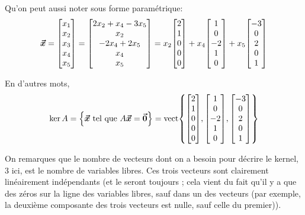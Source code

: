 \documentclass[a4paper]{article}
\begin{document}
{    Qu'on peut aussi noter sous forme paramétrique:
    \[\bvec{x} = \begin{bmatrix} x_1 \\ x_2 \\ x_3 \\ x_4 \\ x_5 \end{bmatrix} = \begin{bmatrix} 2x_2 + x_4 - 3x_5 \\ x_2 \\ -2x_4 + 2x_5 \\ x_4 \\ x_5 \end{bmatrix} = x_2 \begin{bmatrix} 2 \\ 1 \\ 0 \\ 0 \\ 0 \end{bmatrix} + x_4 \begin{bmatrix} 1 \\ 0 \\ -2 \\ 1 \\ 0 \end{bmatrix} + x_5 \begin{bmatrix} -3 \\ 0 \\ 2 \\ 0 \\ 1 \end{bmatrix} \]

    En d'autres mots,
    \[\ker A = \left\{\bvec{x} \telque A \bvec{x} = \bvec{0}\right\} = \vect\left\{\begin{bmatrix} 2 \\ 1 \\ 0 \\ 0 \\ 0 \end{bmatrix}, \begin{bmatrix} 1 \\ 0 \\ -2 \\ 1 \\ 0 \end{bmatrix}, \begin{bmatrix} -3 \\ 0 \\ 2 \\ 0 \\ 1 \end{bmatrix} \right\}\]

    On remarques que le nombre de vecteurs dont on a besoin pour décrire le kernel, 3 ici, est le nombre de variables libres. Ces trois vecteurs sont clairement linéairement indépendants (et le seront toujours ; cela vient du fait qu'il y a que des zéros sur la ligne des variables libres, sauf dans un des vecteurs (par exemple, la deuxième composante des trois vecteurs est nulle, sauf celle du premier)).

}
\end{document}
